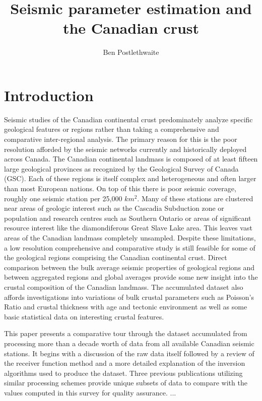 \documentclass[draft, 12pt]{article}
\title{Seismic parameter estimation and the Canadian crust}
\author{Ben Postlethwaite}
\begin{document}
\begin{abstract}

\end{abstract}

\section{Introduction}

  Seismic studies of the Canadian continental crust predominately analyze specific geological features or regions rather than taking a comprehensive and comparative inter-regional analysis. The primary reason for this is the poor resolution afforded by the seismic networks currently and historically deployed across Canada. The Canadian continental landmass is composed of at least fifteen large geological provinces as recognized by the Geological Survey of Canada (GSC). Each of these regions is itself complex and heterogeneous and often larger than most European nations. On top of this there is poor seismic coverage, roughly one seismic station per 25,000 $km^2$. Many of these stations are clustered near areas of geologic interest such as the Cascadia Subduction zone or population and research centres such as Southern Ontario or areas of significant resource interest like the diamondiferous Great Slave Lake area. This leaves vast areas of the Canadian landmass completely unsampled. Despite these limitations, a low resolution comprehensive and comparative study is still feasible for some of the geological regions comprising the Canadian continental crust. Direct comparison between the bulk average seismic properties of geological regions and between aggregated regions and global averages provide some new insight into the crustal composition of the Canadian landmass. The accumulated dataset also affords investigations into variations of bulk crustal parameters such as Poisson's Ratio and crustal thickness with age and tectonic environment as well as some basic statistical data on interesting crustal features.

  This paper presents a comparative tour through the dataset accumulated from processing more than a decade worth of data from all available Canadian seismic stations. It begins with a discussion of the raw data itself followed by a review of the receiver function method and a more detailed explanation of the inversion algorithms used to produce the dataset. Three previous publications utilizing similar processing schemes provide unique subsets of data to compare with the values computed in this survey for quality assurance. ...
\end{document}
